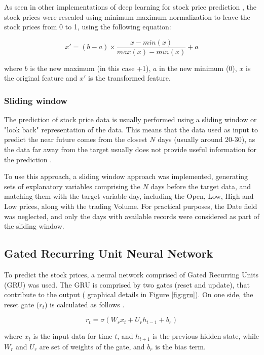 \documentclass[10pt,twocolumn,letterpaper]{article}
\begin{document}
As seen in other implementations of deep learning for stock price prediction \cite{Zhao2020,Kara2011}, the stock prices were rescaled using minimum maximum normalization to leave the stock prices from 0 to 1, using the following equation:

\begin{equation}
	x' = (b-a) \times \frac{x - min(x)}{max(x)-min(x)} + a
\end{equation}

where $b$ is the new maximum (in this case +1), $a$ in the new minimum (0), $x$ is the original feature and $x'$ is the transformed feature.

\subsubsection{Sliding window}

The prediction of stock price data is usually performed using a sliding window or "look back" representation of the data. This means that the data used as input to predict the near future comes from the closest $N$ days (usually around 20-30), as the data far away from the target usually does not provide useful information for the prediction \cite{Saud2020}.

To use this approach, a sliding window approach was implemented, generating sets of explanatory variables comprising the $N$ days before the target data, and matching them with the target variable day, including the Open, Low, High and Low prices, along with the trading Volume. For practical purposes, the Date field was neglected, and only the days with available records were considered as part of the sliding window.

\subsection{Gated Recurring Unit Neural Network}

To predict the stock prices, a neural network comprised of Gated Recurring Units (GRU) was used. The GRU is comprised by two gates (reset and update), that contribute to the output ( graphical details in Figure \ref{fig:gru}). On one side, the reset gate ($r_t$) is calculated as follows \cite{Chung2014}.

\begin{equation}
	r_t = \sigma (W_r x_t + U_r h_{t-1} + b_r) 
\end{equation}

where $x_t$ is the input data for time $t$, and $h_{t+1}$ is the previous hidden state, while $W_r$ and $U_r$ are set of weights of the gate, and $b_r$ is the bias term.
\end{document}

